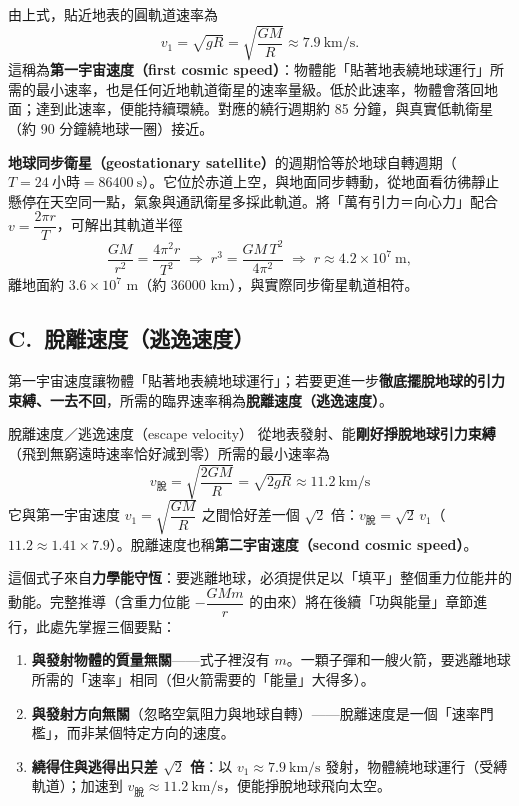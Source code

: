 \documentclass[11pt]{article}
\begin{document}
由上式，貼近地表的圓軌道速率為
$$v_1=\sqrt{gR}=\sqrt{\dfrac{GM}{R}}\approx7.9\ \text{km/s}.$$
這稱為\textbf{第一宇宙速度（first cosmic speed）}：物體能「貼著地表繞地球運行」所需的最小速率，也是任何近地軌道衛星的速率量級。低於此速率，物體會落回地面；達到此速率，便能持續環繞。對應的繞行週期約 85 分鐘，與真實低軌衛星（約 90 分鐘繞地球一圈）接近。

\textbf{地球同步衛星（geostationary satellite）}的週期恰等於地球自轉週期（$T=24\ \text{小時}=86400\ \text{s}$）。它位於赤道上空，與地面同步轉動，從地面看彷彿靜止懸停在天空同一點，氣象與通訊衛星多採此軌道。將「萬有引力＝向心力」配合 $v=\dfrac{2\pi r}{T}$，可解出其軌道半徑
$$\dfrac{GM}{r^2}=\dfrac{4\pi^2 r}{T^2}\;\Longrightarrow\;r^3=\dfrac{GM\,T^2}{4\pi^2}\;\Longrightarrow\;r\approx4.2\times10^{7}\ \text{m},$$
離地面約 $3.6\times10^{7}$ m（約 36000 km），與實際同步衛星軌道相符。

\subsection*{\sffamily C.\ 脫離速度（逃逸速度）}

第一宇宙速度讓物體「貼著地表繞地球運行」；若要更進一步\textbf{徹底擺脫地球的引力束縛、一去不回}，所需的臨界速率稱為\textbf{脫離速度（逃逸速度）}。

\begin{補充框}{脫離速度／逃逸速度（escape velocity）}
從地表發射、能\textbf{剛好掙脫地球引力束縛}（飛到無窮遠時速率恰好減到零）所需的最小速率為
$$\boxed{\,v_{\text{脫}}=\sqrt{\dfrac{2GM}{R}}=\sqrt{2gR}\approx11.2\ \text{km/s}\,}$$
它與第一宇宙速度 $v_1=\sqrt{\dfrac{GM}{R}}$ 之間恰好差一個 $\sqrt2$ 倍：$v_{\text{脫}}=\sqrt2\,v_1$（$11.2\approx1.41\times7.9$）。脫離速度也稱\textbf{第二宇宙速度（second cosmic speed）}。
\end{補充框}

這個式子來自\textbf{力學能守恆}：要逃離地球，必須提供足以「填平」整個重力位能井的動能。完整推導（含重力位能 $-\dfrac{GMm}{r}$ 的由來）將在後續「功與能量」章節進行，此處先掌握三個要點：

\begin{enumerate}\setlength{\itemsep}{2pt}
\item \textbf{與發射物體的質量無關}——式子裡沒有 $m$。一顆子彈和一艘火箭，要逃離地球所需的「速率」相同（但火箭需要的「能量」大得多）。
\item \textbf{與發射方向無關}（忽略空氣阻力與地球自轉）——脫離速度是一個「速率門檻」，而非某個特定方向的速度。
\item \textbf{繞得住與逃得出只差 $\sqrt2$ 倍}：以 $v_1\approx7.9\ \text{km/s}$ 發射，物體繞地球運行（受縛軌道）；加速到 $v_{\text{脫}}\approx11.2\ \text{km/s}$，便能掙脫地球飛向太空。
\end{enumerate}
\end{document}
